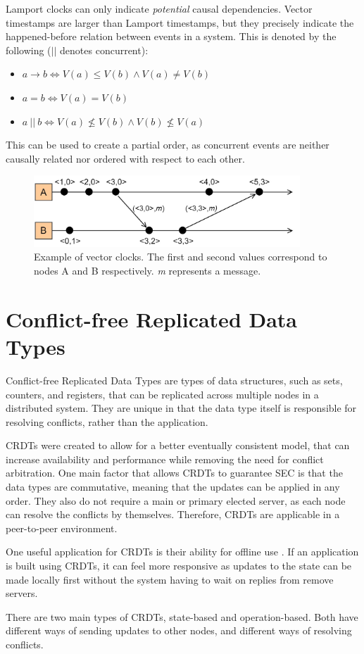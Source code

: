 \documentclass[12pt]{report}
\begin{document}
Lamport clocks can only indicate \emph{potential} causal dependencies. Vector timestamps are larger than Lamport timestamps, but they precisely indicate the happened-before relation between events in a system. This is denoted by the following ($\vert \vert$ denotes concurrent):

\begin{itemize}
    \item $a \rightarrow b \iff V(a) \leq V(b) \land V(a) \not = V(b)$
    \item $a = b \iff V(a) = V(b)$
    \item $a \: || \:  b \iff V(a) \not \leq V(b) \land V(b) \not \leq V(a)$
\end{itemize}

This can be used to create a partial order, as concurrent events are neither causally related nor ordered with respect to each other.

\begin{figure}
    \centering
    \includegraphics[width=10cm]{VectorClocks.jpg}
    \caption{Example of vector clocks. The first and second values correspond to nodes A and B respectively. \textit{m} represents a message.}
    \label{fig:vector}
\end{figure}

\section{Conflict-free Replicated Data Types}
Conflict-free Replicated Data Types are types of data structures, such as sets, counters, and registers, that can be replicated across multiple nodes in a distributed system. They are unique in that the data type itself is responsible for resolving conflicts, rather than the application. 

CRDTs were created to allow for a better eventually consistent model, that can increase availability and performance while removing the need for conflict arbitration.  One main factor that allows CRDTs to guarantee SEC is that the data types are commutative\cite{10.1007/978-3-642-24550-3_29}, meaning that the updates can be applied in any order. They also do not require a main or primary elected server, as each node can resolve the conflicts by themselves. Therefore, CRDTs are applicable in a peer-to-peer environment. \par
One useful application for CRDTs is their ability for offline use \cite{10.1145/3359591.3359737}. If an application is built using CRDTs, it can feel more responsive as updates to the state can be made locally first without the system having to wait on replies from remove servers. \par
There are two main types of CRDTs, state-based and operation-based. Both have different ways of sending updates to other nodes, and different ways of resolving conflicts. \par
\end{document}
